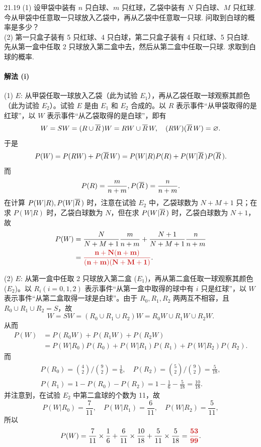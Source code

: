 \documentclass[11pt, UTF8]{ctexart}
\newcommand{\Prob}{P}
\newcommand{\comp}[1]{\overline{#1}\mskip 3mu}
\newcommand{\ans}[1]{\mathbf{\color{fred}#1}}
\begin{document}
\begin{problem}{2}{1.19}
(1) 设甲袋中装有 $n$ 只白球、$m$ 只红球，乙袋中装有 $N$ 只白球、$M$ 只红球. 今从甲袋中任意取一只球放入乙袋中，再从乙袋中任意取一只球. 问取到白球的概率是多少？\\
(2) 第一只盒子装有 5 只红球、4 只白球，第二只盒子装有 4 只红球、5 只白球. 先从第一盒中任取 2 只球放入第二盒中去，然后从第二盒中任取一只球. 求取到白球的概率.
\end{problem}

\paragraph{\color{fblue}解法 (i)}
(1) $E$: 从甲袋任取一球放入乙袋（此为试验 $E_1$），再从乙袋任取一球观察其颜色（此为试验 $E_2$）。试验 $E$ 是由 $E_1$ 和 $E_2$ 合成的。以 $R$ 表示事件“从甲袋取得的是红球”，以 $W$ 表示事件“从乙袋取得的是白球”，即有
\[ W = SW = (R \cup \comp{R})W = RW \cup \comp{R}W, \quad (RW)(\comp{R}W) = \varnothing. \]
于是
\[ \Prob(W) = \Prob(RW) + \Prob(\comp{R}W) = \Prob(W|R)\Prob(R) + \Prob(W|\comp{R})\Prob(\comp{R}). \]
而 
$$\Prob(R) = \frac{m}{n+m}, \Prob(\comp{R}) = \frac{n}{n+m}.$$
在计算 $\Prob(W|R), \Prob(W|\comp{R})$ 时，注意在试验 $E_2$ 中，乙袋球数为 $N+M+1$ 只；在求 $\Prob(W|R)$ 时，乙袋白球数为 $N$，但在求 $\Prob(W|\comp{R})$ 时，乙袋白球数为 $N+1$，故
\begin{align*}
    \Prob(W) &= \frac{N}{N+M+1} \frac{m}{n+m} + \frac{N+1}{N+M+1} \frac{n}{n+m} \\
        &= \ans{\frac{n+N(n+m)}{(n+m)(N+M+1)}}.
\end{align*}

(2) $E$: 从第一盒中任取 2 只球放入第二盒 ($E_1$)，再从第二盒任取一球观察其颜色 ($E_2$)。以 $R_i (i=0,1,2)$ 表示事件“从第一盒中取得的球中有 $i$ 只是红球”，以 $W$ 表示事件“从第二盒取得一球是白球”。由于 $R_0, R_1, R_2$ 两两互不相容，且 $R_0 \cup R_1 \cup R_2 = S$，故
\[ W = SW = (R_0 \cup R_1 \cup R_2)W = R_0W \cup R_1W \cup R_2W. \]
从而
\begin{align*}
        \Prob(W) &= \Prob(R_0W) + \Prob(R_1W) + \Prob(R_2W) \\
        &= \Prob(W|R_0)\Prob(R_0) + \Prob(W|R_1)\Prob(R_1) + \Prob(W|R_2)\Prob(R_2).
\end{align*}
而
\begin{align*}
        \Prob(R_0) = \binom{4}{2} \Big/ \binom{9}{2} = \frac{1}{6}, \quad \Prob(R_2) = \binom{5}{2} \Big/ \binom{9}{2} = \frac{5}{18},\\
        \Prob(R_1) = 1 - \Prob(R_0) - \Prob(R_2) = 1 - \frac{1}{6} - \frac{5}{18} = \frac{10}{18}.
\end{align*}
并注意到，在试验 $E_2$ 中第二盒球的个数为 11，故
\[ \Prob(W|R_0) = \frac{7}{11}, \quad \Prob(W|R_1) = \frac{6}{11}, \quad \Prob(W|R_2) = \frac{5}{11}, \]
所以
\[ \Prob(W) = \frac{7}{11} \times \frac{1}{6} + \frac{6}{11} \times \frac{10}{18} + \frac{5}{11} \times \frac{5}{18} = \ans{\frac{53}{99}}. \]
\end{document}
